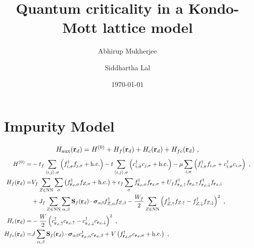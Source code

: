 \documentclass[%
reprint,
superscriptaddress,
groupedaddress,
superscriptaddress,
onecolumn,
10pt
]{revtex4-2}
\begin{document}
\title{Quantum criticality in a Kondo-Mott lattice model}

\author{Abhirup Mukherjee}
\author{Siddhartha Lal}

\date{\today}

\maketitle
\section{Impurity Model}
\begin{equation}\begin{aligned}
	H_\text{aux}({\bf r}_d) = H^{(0)} + H_f({\bf r}_d) + H_c({\bf r}_d) + H_{fc}({\bf r}_d)~,
\end{aligned}\end{equation}
\begin{equation}\begin{aligned}
	H^{(0)} =& -t_f\sum_{\braket{i,j},\sigma}\left(f^\dagger_{i,\sigma}f_{j,\sigma} + \text{h.c.}\right) -t\sum_{\braket{i,j},\sigma}\left(c^\dagger_{i,\sigma}c_{j,\sigma} + \text{h.c.}\right) - \mu\sum_{i,\sigma}\left(f^\dagger_{i,\sigma}f_{i,\sigma} + c^\dagger_{i,\sigma}c_{i,\sigma}\right) ~,\\
	H_f({\bf r}_d) =& V_f\sum_{Z \in \text{NN}}\sum_{\sigma}\left(f^\dagger_{{\bf r}_d,\sigma} f_{Z,\sigma} + \text{h.c.}\right) + \epsilon_f \sum_\sigma f^\dagger_{{\bf r}_d,\sigma}f_{{\bf r}_d,\sigma} + U_f f^\dagger_{{\bf r}_d,\uparrow}f_{{\bf r}_d,\uparrow} f^\dagger_{{\bf r}_d,\downarrow}f_{{\bf r}_d,\downarrow} \\
				   &+ J_f\sum_{Z \in \text{NN}}\sum_{\alpha,\beta}{\bf S}_f({\bf r}_d) \cdot {\boldsymbol{\sigma}}_{\alpha\beta}f^\dagger_{Z,\alpha}f_{Z,\beta} - \frac{W_f}{2} \sum_{Z \in \text{NN}}\left(f^\dagger_{Z,\uparrow}f_{Z,\uparrow} - f^\dagger_{Z,\downarrow}f_{Z,\downarrow} \right)^2~,\\
	H_c({\bf r}_d) =& - \frac{W}{2}\left(c^\dagger_{{\bf r}_d,\uparrow}c_{{\bf r}_d,\uparrow} - c^\dagger_{{\bf r}_d,\downarrow}c_{{\bf r}_d,\downarrow} \right)^2~,\\
	H_{fc}({\bf r}_d) =& J\sum_{\alpha,\beta}{\bf S}_f({\bf r}_d) \cdot {\boldsymbol{\sigma}}_{\alpha\beta}c^\dagger_{{\bf r}_d,\alpha}c_{{\bf r}_d,\beta} + V \left(f^\dagger_{{\bf r}_d,\sigma} c_{{\bf r}_d,\sigma} + \text{h.c.}\right)~,\\
\end{aligned}\end{equation}
\end{document}
